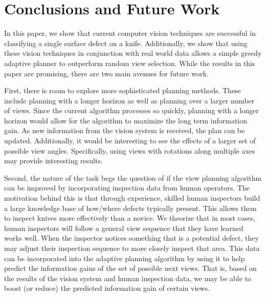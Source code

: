 \documentclass[letterpaper, 10 pt, conference]{ieeeconf}  %
\begin{document}
\section{Conclusions and Future Work}

In this paper, we show that current computer vision techniques are successful in classifying a single surface defect on a knife. Additionally, we show that using these vision techniques in conjunction with real world data allows a simple greedy adaptive planner to outperform random view selection. While the results in this paper are promising, there are two main avenues for future work.

First, there is room to explore more sophisticated planning methods. These include planning with a longer horizon as well as planning over a larger number of views. Since the current algorithm processes so quickly, planning with a longer horizon would allow for the algorithm to maximize the long term information gain. As new information from the vision system is received, the plan can be updated. Additionally, it would be interesting to see the effects of a larger set of possible view angles. Specifically, using views with rotations along multiple axes may provide interesting results.

Second, the nature of the task begs the question of if the view planning algorithm can be improved by incorporating inspection data from human operators. The motivation behind this is that through experience, skilled human inspectors build a large knowledge base of how/where defects typically present. This allows them to inspect knives more effectively than a novice. We theorize that in most cases, human inspectors will follow a general view sequence that they have learned works well. When the inspector notices something that is a potential defect, they may adjust their inspection sequence to more closely inspect that area. This data can be incorporated into the adaptive planning algorithm by using it to help predict the information gains of the set of possible next views. That is, based on the results of the vision system and human inspection data, we may be able to boost (or reduce) the predicted information gain of certain views.



\end{document}
